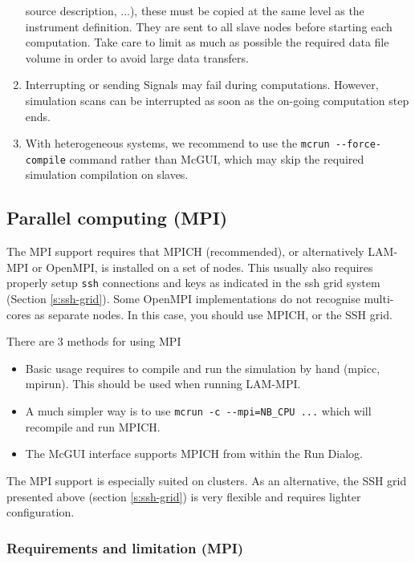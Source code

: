 \begin{enumerate}
{      source description, ...), these must be copied at the same level as the
      instrument definition. They are sent to all slave nodes before starting
      each computation.  Take care to limit as much as possible the required
      data file volume in order to avoid large data transfers.}
  \item Interrupting or sending Signals may fail during computations. However,
  simulation scans can be interrupted as soon as the on-going computation
  step ends.
\item With heterogeneous systems, we recommend to use the
  \verb+mcrun --force-compile+ command rather than McGUI, which may skip the
  required simulation compilation on slaves.
  \end{enumerate}

\subsection{Parallel computing (MPI)}
\label{s:mpi}
The MPI support requires that MPICH (recommended), or alternatively LAM-MPI or
OpenMPI, is installed on a set of nodes. This usually also requires properly
setup \texttt{ssh} connections and keys as indicated in the ssh grid system
(Section \ref{s:ssh-grid}). Some OpenMPI implementations do not recognise
multi-cores as separate nodes. In this case, you should use MPICH, or the SSH
grid.

There are 3 methods for using MPI
\begin{itemize}
\item Basic usage requires to compile and run the simulation by hand (mpicc, mpirun).
  This should be used when running LAM-MPI.
\item A much simpler way is to use \verb+mcrun -c --mpi=NB_CPU ...+ which will
  recompile and run MPICH.
\item The McGUI interface supports MPICH from within the Run Dialog.
\end{itemize}

The MPI support is especially suited on clusters. As an alternative, the SSH
grid presented above (section \ref{s:ssh-grid}) is very flexible and requires
lighter configuration.

\subsubsection{Requirements and limitation (MPI)}

